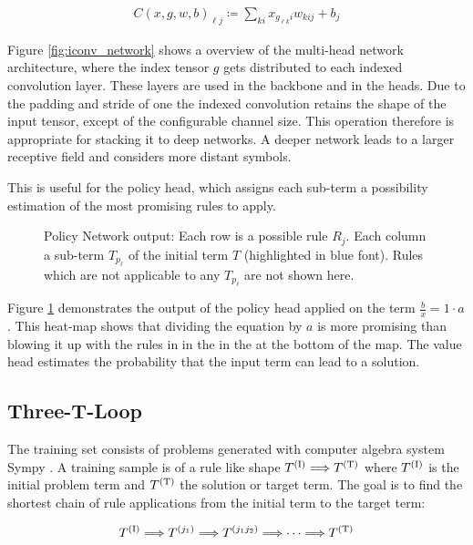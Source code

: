\documentclass{scrartcl}
\theoremstyle{definition}
\begin{document}
\begin{align}
	C\left( x, g, w, b \right)_{\ell j} \coloneqq \sum_{ki}x_{g_{\ell k}i} w_{kij}+b_j
\end{align}

Figure \ref{fig:iconv_network} shows a overview of the multi-head network architecture, where the index tensor $g$ gets distributed to each indexed convolution layer.
These layers are used in the backbone and in the heads.
Due to the padding and stride of one the indexed convolution retains the shape of the input tensor, except of the configurable channel size.
This operation therefore is appropriate for stacking it to deep networks.
A deeper network leads to a larger receptive field and considers more distant symbols.

This is useful for the policy head, which assigns each sub-term a possibility estimation of the most promising rules to apply.

\begin{figure}[!htbp]
	\centering
	
	\caption{Policy Network output: Each row is a possible rule $R_j$. Each column a sub-term $T_{p_\ell}$ of the initial term $T$ (highlighted in blue font).
	Rules which are not applicable to any $T_{p_\ell}$ are not shown here.
	}
	\label{fig:network_output}
\end{figure}

Figure \ref{fig:network_output} demonstrates the output of the policy head applied on the term $\frac{b}{x}=1\cdot a$.
This heat-map shows that dividing the equation by $a$ is more promising than blowing it up with the rules in in the in the at the bottom of the map.
The value head estimates the probability that the input term can lead to a solution.

\subsection{Three-T-Loop}

The training set consists of problems generated with computer algebra system Sympy \cite{10.7717/peerj-cs.103}.
A training sample is of a rule like shape $T^{(\text I)} \Longrightarrow T^{(\text T)}$ where $T^{(\text I)}$ is the initial problem term and $T^{(\text T)}$ the solution or target term.
The goal is to find the shortest chain of rule applications from the initial term to the target term:

\begin{align}
	T^{(\text I)} \Longrightarrow T^{(j_1)} \Longrightarrow T^{(j_1j_2)} \Longrightarrow \cdots \Longrightarrow T^{(\text T)}
	\label{eq:calculation_chain}
\end{align}
\end{document}
